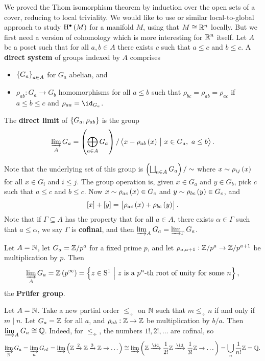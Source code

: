 We proved the Thom isomorphism theorem by induction over the open sets of a cover, reducing to local triviality. We would like to use or similar local-to-global approach to study $ \H^\bullet\br{M} $ for a manifold $ M $, using that $ M \cong \mathbb{R}^n $ locally. But we first need a version of cohomology which is more interesting for $ \mathbb{R}^n $ itself. Let $ A $ be a poset such that for all $ a, b \in A $ there exists $ c $ such that $ a \le c $ and $ b \le c $. A \textbf{direct system} of groups indexed by $ A $ comprises
\begin{itemize}
\item $ \cbr{G_a}_{a \in A} $ for $ G_a $ abelian, and
\item $ \rho_{ab} : G_a \to G_b $ homomorphisms for all $ a \le b $ such that $ \rho_{bc} = \rho_{ab} = \rho_{ac} $ if $ a \le b \le c $ and $ \rho_{aa} = \id_{G_a} $.
\end{itemize}

\begin{definition*}
The \textbf{direct limit} of $ \cbr{G_a, \rho_{ab}} $ is the group
$$ \varinjlim_A G_a = \br{\bigoplus_{a \in A} G_a} / \abr{x - \rho_{ab}\br{x} \st x \in G_a, \ a \le b}. $$
\end{definition*}

Note that the underlying set of this group is $ \br{\bigsqcup_{a \in A} G_a} / \sim $ where $ x \sim \rho_{ij}\br{x} $ for all $ x \in G_i $ and $ i \le j $. The group operation is, given $ x \in G_a $ and $ y \in G_b $, pick $ c $ such that $ a \le c $ and $ b \le c $. Now $ x \sim \rho_{ac}\br{x} \in G_c $ and $ y \sim \rho_{bc}\br{y} \in G_c $, and
$$ \sbr{x} + \sbr{y} = \sbr{\rho_{ac}\br{x} + \rho_{bc}\br{y}}. $$
Note that if $ \Gamma \subseteq A $ has the property that for all $ a \in A $, there exists $ \alpha \in \Gamma $ such that $ a \le \alpha $, we say $ \Gamma $ is \textbf{cofinal}, and then $ \varinjlim_A G_a = \varinjlim_\Gamma G_a $.

\begin{example*}
Let $ A = \mathbb{N} $, let $ G_a = \mathbb{Z} / p^a $ for a fixed prime $ p $, and let $ \rho_{a, a + 1} : \mathbb{Z} / p^a \to \mathbb{Z} / p^{a + 1} $ be multiplication by $ p $. Then
$$ \varinjlim_A G_a = \ZZ\br{p^\infty} = \cbr{z \in \S^1 \st z \ \text{is a $ p^n $-th root of unity for some} \ n}, $$
the \textbf{Pr\"ufer group}.
\end{example*}

\begin{example*}
Let $ A = \mathbb{N} $. Take a new partial order $ \le_{\div} $ on $ \mathbb{N} $ such that $ m \le_{\div} n $ if and only if $ m \mid n $. Let $ G_a = \mathbb{Z} $ for all $ a $, and $ \rho_{ab} : \mathbb{Z} \to \mathbb{Z} $ be multiplication by $ b / a $. Then $ \varinjlim_A G_a \cong \mathbb{Q} $. Indeed, for $ \le_{\div} $, the numbers $ 1!, 2!, \dots $ are cofinal, so
$$ \varinjlim_\NN G_a = \varinjlim_n G_{n!} = \varinjlim \br{\ZZ \xrightarrow{2} \ZZ \xrightarrow{3} \ZZ \to \dots} \cong \varinjlim \br{\ZZ \xrightarrow{\id} \dfrac{1}{2!}\ZZ \xrightarrow{\id} \dfrac{1}{3!}\ZZ \to \dots} = \bigcup_n \dfrac{1}{n!}\ZZ = \QQ. $$
\end{example*}

